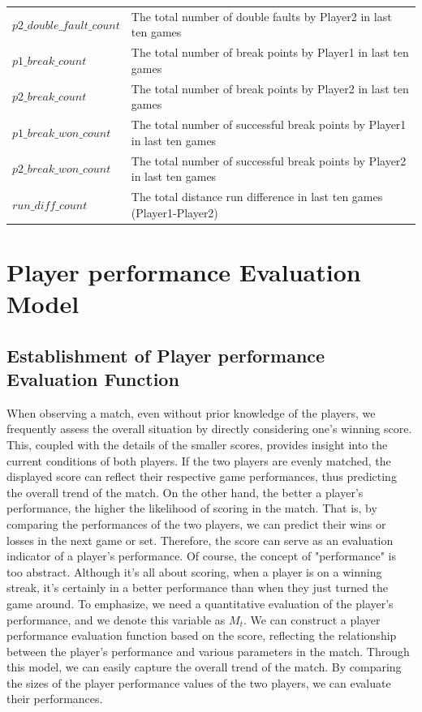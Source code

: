 \documentclass[UTF8]{ctexart} %
\begin{document}
\begin{table}[H]
\begin{tabularx}{\textwidth}{XX}
        $p2\_double\_fault\_count$ & The total number of double faults by Player2 in last ten games \\
        $p1\_break\_count$ & The total number of break points by Player1 in last ten games \\
        $p2\_break\_count$ & The total number of break points by Player2 in last ten games \\
        $p1\_break\_won\_count$ & The total number of successful break points by Player1 in last ten games \\
        $p2\_break\_won\_count$ & The total number of successful break points by Player2 in last ten games \\
        $run\_diff\_count$ & The total distance run difference in last ten games (Player1-Player2) \\
    \bottomrule
    \end{tabularx}
\end{table}


\section{\textbf{Player performance Evaluation Model}}
\subsection{\textbf{Establishment of Player performance Evaluation Function}}
When observing a match, even without prior knowledge of the players, we frequently assess the 
overall situation by directly considering one's winning score. This, coupled with the details of 
the smaller scores, provides insight into the current conditions of both players.
If the two players are evenly matched, the displayed score can reflect their respective game performances, thus predicting 
the overall trend of the match. On the other hand, the better a player's performance, the higher the likelihood of scoring 
in the match. That is, by comparing the performances of the two players, we can predict their wins or losses in the next game 
or set. Therefore, the score can serve as an evaluation indicator of a player's performance. Of course, the concept of "performance"
 is too abstract. Although it's all about scoring, when a player is on a winning streak, it's certainly in a better 
 performance than when they just turned the game around. To emphasize, we need a quantitative evaluation of the 
 player's performance, and we denote this variable as $M_t$. We can construct a player performance evaluation function based on 
 the score, reflecting the relationship between the player's performance and various parameters in the match. Through this
  model, we can easily capture the overall trend of the match. By comparing the sizes of the player performance values of 
  the two players, we can evaluate their performances.
\end{document}
